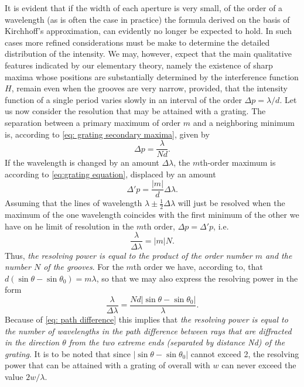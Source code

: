 \documentclass[12pt,twoside,english]{book}
\renewcommand{\~}{\perispomeni}%
\numberwithin{equation}{section}
\numberwithin{figure}{section}
\begin{document}
It is evident that if the width of each aperture is very small, of the order of a wavelength (as is often the case in practice) the formula derived on the basis of Kirchhoff's approximation, can evidently no longer be expected to hold. In such cases more refined considerations must be make to determine the detailed distribution of the intensity. We may, however, expect that the main qualitative features indicated by our elementary theory, namely the existence of sharp maxima whose positions are substantially determined by the interference function $H$, remain even when the grooves are very narrow, provided, that the intensity function of a single period varies slowly in an interval of the order $\Delta p=\lambda/d$. Let us now consider the resolution that may be attained with a grating. The separation between a primary maximum of order $m$ and a neighboring minimum is, according to \ref{eq: grating secondary maxima}, given by
\begin{equation}
\Delta p=\frac{\lambda}{Nd}.
\end{equation}
If the wavelength is changed by an amount $\Delta\lambda$, the $m$th-order maximum is according to \ref{eq:grating equation}, displaced by an amount
\begin{equation}
\Delta'p=\frac{\left|m\right|}{d}\Delta\lambda.
\end{equation}
Assuming that the lines of wavelength $\lambda\pm\frac{1}{2}\Delta\lambda$ will just be resolved when the maximum of the one wavelength coincides with the first minimum of the other we have on he limit of resolution in the $m$th order, $\Delta p=\Delta'p$, i.e.
\begin{equation}
\frac{\lambda}{\Delta\lambda}=\left|m\right|N.
\label{eq:resolving power}
\end{equation}
Thus, \emph{the resolving power is equal to the product of the order number $m$ and the number $N$ of the grooves}. For the $m$th order we have, according to, that $d\left(\sin\theta-\sin\theta_{0}\right)=m\lambda$, so that we may also express the resolving power in the form
\begin{equation}
\frac{\lambda}{\Delta\lambda}=\frac{Nd\left|\sin\theta-\sin\theta_{0}\right|}{\lambda}.
\end{equation}
Because of \ref{eq: path difference} this implies that \emph{the resolving power is equal to the number of wavelengths in the path difference between rays that are diffracted in the direction $\theta$ from the two extreme ends (separated by distance Nd) of the grating}.
It is to be noted that since $\left|\sin\theta-\sin\theta_{0}\right|$ cannot exceed 2, the resolving power that can be attained with a grating of overall with $w$ can never exceed the value $2w/\lambda$.
\end{document}
